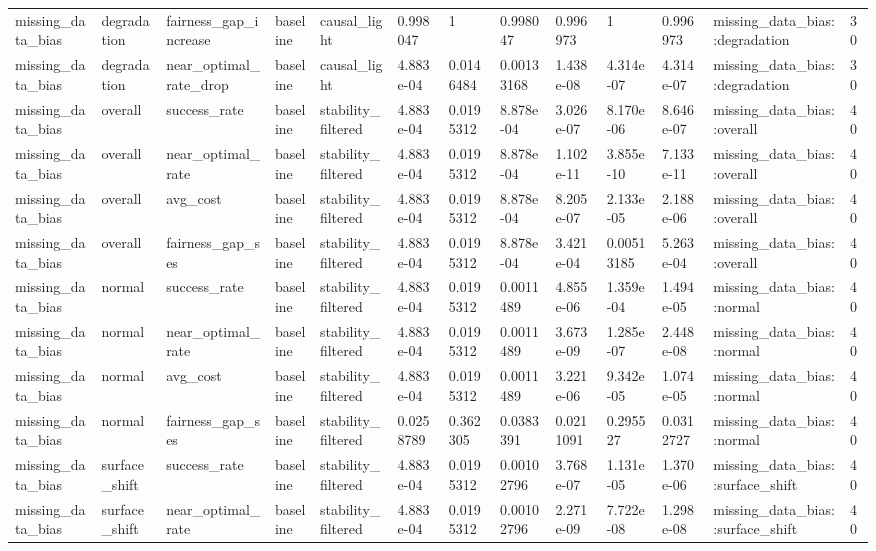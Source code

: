 \begin{tabular}{lllllllllllll}
missing\_data\_bias & degradation & fairness\_gap\_increase & baseline & causal\_light & 0.998047 & 1 & 0.998047 & 0.996973 & 1 & 0.996973 & missing\_data\_bias::degradation & 30 \\
missing\_data\_bias & degradation & near\_optimal\_rate\_drop & baseline & causal\_light & 4.883e-04 & 0.0146484 & 0.00133168 & 1.438e-08 & 4.314e-07 & 4.314e-07 & missing\_data\_bias::degradation & 30 \\
missing\_data\_bias & overall & success\_rate & baseline & stability\_filtered & 4.883e-04 & 0.0195312 & 8.878e-04 & 3.026e-07 & 8.170e-06 & 8.646e-07 & missing\_data\_bias::overall & 40 \\
missing\_data\_bias & overall & near\_optimal\_rate & baseline & stability\_filtered & 4.883e-04 & 0.0195312 & 8.878e-04 & 1.102e-11 & 3.855e-10 & 7.133e-11 & missing\_data\_bias::overall & 40 \\
missing\_data\_bias & overall & avg\_cost & baseline & stability\_filtered & 4.883e-04 & 0.0195312 & 8.878e-04 & 8.205e-07 & 2.133e-05 & 2.188e-06 & missing\_data\_bias::overall & 40 \\
missing\_data\_bias & overall & fairness\_gap\_ses & baseline & stability\_filtered & 4.883e-04 & 0.0195312 & 8.878e-04 & 3.421e-04 & 0.00513185 & 5.263e-04 & missing\_data\_bias::overall & 40 \\
missing\_data\_bias & normal & success\_rate & baseline & stability\_filtered & 4.883e-04 & 0.0195312 & 0.0011489 & 4.855e-06 & 1.359e-04 & 1.494e-05 & missing\_data\_bias::normal & 40 \\
missing\_data\_bias & normal & near\_optimal\_rate & baseline & stability\_filtered & 4.883e-04 & 0.0195312 & 0.0011489 & 3.673e-09 & 1.285e-07 & 2.448e-08 & missing\_data\_bias::normal & 40 \\
missing\_data\_bias & normal & avg\_cost & baseline & stability\_filtered & 4.883e-04 & 0.0195312 & 0.0011489 & 3.221e-06 & 9.342e-05 & 1.074e-05 & missing\_data\_bias::normal & 40 \\
missing\_data\_bias & normal & fairness\_gap\_ses & baseline & stability\_filtered & 0.0258789 & 0.362305 & 0.0383391 & 0.0211091 & 0.295527 & 0.0312727 & missing\_data\_bias::normal & 40 \\
missing\_data\_bias & surface\_shift & success\_rate & baseline & stability\_filtered & 4.883e-04 & 0.0195312 & 0.00102796 & 3.768e-07 & 1.131e-05 & 1.370e-06 & missing\_data\_bias::surface\_shift & 40 \\
missing\_data\_bias & surface\_shift & near\_optimal\_rate & baseline & stability\_filtered & 4.883e-04 & 0.0195312 & 0.00102796 & 2.271e-09 & 7.722e-08 & 1.298e-08 & missing\_data\_bias::surface\_shift & 40 \\

\end{tabular}
